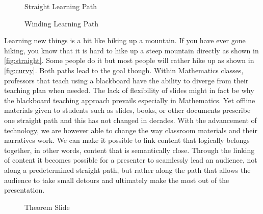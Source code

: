 \documentclass{llncs}
\begin{document}
\begin{figure}
\vspace{-2.1em}\centering
      \vspace{-1.8em}
    \caption{Straight Learning Path}\label{fig:straight}
    \vspace{5pt}  
      \vspace{-1.8em}
      \caption{Winding Learning Path}\label{fig:curvy}
      \vspace{-2.8em}
\end{figure}

Learning new things is a bit like hiking up a mountain. If you have ever gone hiking, you
know that it is hard to hike up a steep mountain directly as shown in
\autoref{fig:straight}. Some people do it but most people will rather hike up as shown in
\autoref{fig:curvy}. Both paths lead to the goal though. Within Mathematics classes, professors that teach using a blackboard have the ability to diverge from their teaching plan when needed. The lack of flexibility of slides might in fact be why the blackboard teaching approach prevails especially in Mathematics. Yet offline materials given to students such as slides, books, or other documents prescribe one straight path and this has not changed in decades. With the advancement of technology, we are however able to change the way classroom materials and their
narratives work. We can make it possible to link content that logically belongs together,
in other words, content that is semantically close. Through the linking of content it
becomes possible for a presenter to seamlessly lead an audience, not along a predetermined
straight path, but rather along the path that allows the audience to take small detours
and ultimately make the most out of the presentation.

\begin{figure}\centering\vspace{-2em}
  \vspace{-.5em}
  \caption{Theorem Slide}\label{fig:slideP}
  \vspace{-20pt}
\end{figure}
\end{document}
